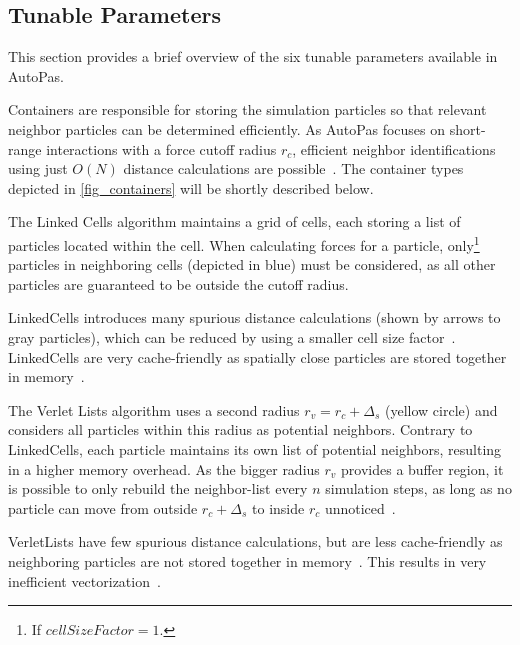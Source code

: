 \documentclass[conference]{IEEEtran}
\begin{document}
\subsection{Tunable Parameters}

This section provides a brief overview of the six tunable parameters available in AutoPas.

\begin{description}[style=nextline]
    \item[Container]
        Containers are responsible for storing the simulation particles so that relevant neighbor particles can be determined efficiently. As AutoPas focuses on short-range interactions with a force cutoff radius $r_c$, efficient neighbor identifications using just $O(N)$ distance calculations are possible~\cite{Gratl2019AutoPas}. The container types depicted in \autoref{fig_containers} will be shortly described below.

        \begin{description}[style=nextline, font=\itshape]
            \item[$\bullet$ Linked Cells]
                The Linked Cells algorithm maintains a grid of cells, each storing a list of particles located within the cell. When calculating forces for a particle, only\footnote{If $cellSizeFactor = 1$.} particles in neighboring cells (depicted in blue) must be considered, as all other particles are guaranteed to be outside the cutoff radius.

                LinkedCells introduces many spurious distance calculations (shown by arrows to gray particles), which can be reduced by using a smaller cell size factor~\cite{menges2019}. LinkedCells are very cache-friendly as spatially close particles are stored together in memory~\cite{Gratl2022AutoPas}.

            \item[$\bullet$ Verlet Lists]
                The Verlet Lists algorithm uses a second radius $r_v = {r_c} + \Delta_s$ (yellow circle) and considers all particles within this radius as potential neighbors. Contrary to LinkedCells, each particle maintains its own list of potential neighbors, resulting in a higher memory overhead.
                As the bigger radius $r_v$ provides a buffer region, it is possible to only rebuild the neighbor-list every $n$ simulation steps, as long as no particle can move from outside $r_c + \Delta_s$ to inside $r_c$ unnoticed~\cite{NEWCOME2023115278}.

                VerletLists have few spurious distance calculations, but are less cache-friendly as neighboring particles are not stored together in memory~\cite{Gratl2022AutoPas}. This results in very inefficient vectorization~\cite{PALL20132641}.


\end{description}
\end{description}
\end{document}
